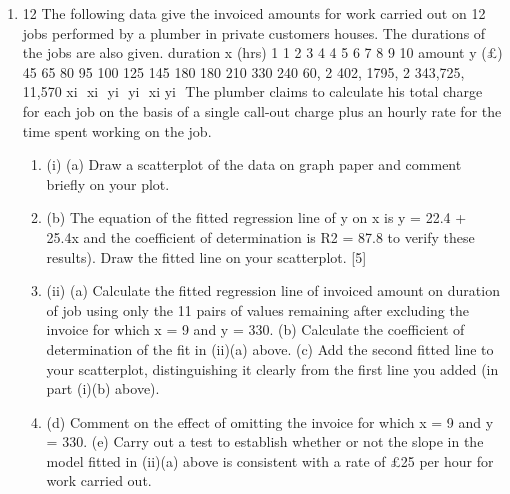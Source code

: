 \documentclass[a4paper,12pt]{article}
\begin{document}
\begin{enumerate}
\item 12 The following data give the invoiced amounts for work carried out on 12 jobs
performed by a plumber in private customers houses. The durations of the jobs are
also given.
duration x (hrs) 1 1 2 3 4 4 5 6 7 8 9 10
amount y (£) 45 65 80 95 100 125 145 180 180 210 330 240
60, 2 402, 1795, 2 343,725, 11,570 xi  xi  yi  yi  xi yi 
The plumber claims to calculate his total charge for each job on the basis of a single
call-out charge plus an hourly rate for the time spent working on the job.
\begin{enumerate}
    \item (i) (a) Draw a scatterplot of the data on graph paper and comment briefly on
your plot.
\item (b) The equation of the fitted regression line of y on x is y = 22.4 + 25.4x
and the coefficient of determination is R2 = 87.8%
to verify these results).
Draw the fitted line on your scatterplot. [5]
\item (ii) (a) Calculate the fitted regression line of invoiced amount on duration of
job using only the 11 pairs of values remaining after excluding the
invoice for which x = 9 and y = 330.
(b) Calculate the coefficient of determination of the fit in (ii)(a) above.
(c) Add the second fitted line to your scatterplot, distinguishing it clearly
from the first line you added (in part (i)(b) above).
\item (d) Comment on the effect of omitting the invoice for which x = 9 and
y = 330.
(e) Carry out a test to establish whether or not the slope in the model fitted
in (ii)(a) above is consistent with a rate of £25 per hour for work
carried out.
\end{enumerate}


\end{enumerate}
\end{document}
